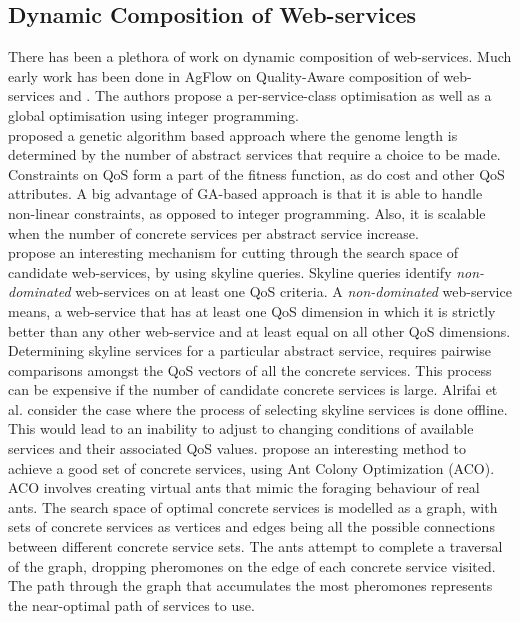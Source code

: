 \documentclass[10pt,journal,compsoc]{IEEEtran}
\begin{document}
\subsection{Dynamic Composition of Web-services} \label{dynamic_wsc}
There has been a plethora of work on dynamic composition of web-services. Much early work has been done in AgFlow \cite{Zeng2001AgFlow} on Quality-Aware composition of web-services \cite{Benatallah2002Declarative} and \cite{Zeng2003Quality}. The authors propose a per-service-class optimisation as well as a global optimisation using integer programming.\\
\cite{Canfora2005approach} proposed a genetic algorithm based approach where the genome length is determined by the number of abstract services that require a choice to be made. Constraints on QoS form a part of the fitness function, as do cost and other QoS attributes. A big advantage of GA-based approach is that it is able to handle non-linear constraints, as opposed to integer programming. Also, it is scalable when the number of concrete services per abstract service increase.\\
\cite{Alrifai2010Selecting} propose an interesting mechanism for cutting through the search space of candidate web-services, by using skyline queries. Skyline queries identify \textit{non-dominated} web-services on at least one QoS criteria. A \textit{non-dominated} web-service means, a web-service that has at least one QoS dimension in which it is strictly better than any other web-service and at least equal on all other QoS dimensions. Determining skyline services for a particular abstract service, requires pairwise comparisons amongst the QoS vectors of all the concrete services. This process can be expensive if the number of candidate concrete services is large. Alrifai et al. consider the case where the process of selecting skyline services is done offline. This would lead to an inability to adjust to changing conditions of available services and their associated QoS values. 	
\cite{Zhang2010QoS-Based} propose an interesting method to achieve a good set of concrete services, using Ant Colony Optimization (ACO). ACO involves creating virtual ants that mimic the foraging behaviour of real ants. The search space of optimal concrete services is modelled as a graph, with sets of concrete services as vertices and edges being all the possible connections between different concrete service sets. The ants attempt to complete a traversal of the graph, dropping pheromones on the edge of each concrete service visited. The path through the graph that accumulates the most pheromones represents the near-optimal path of services to use.
\end{document}
